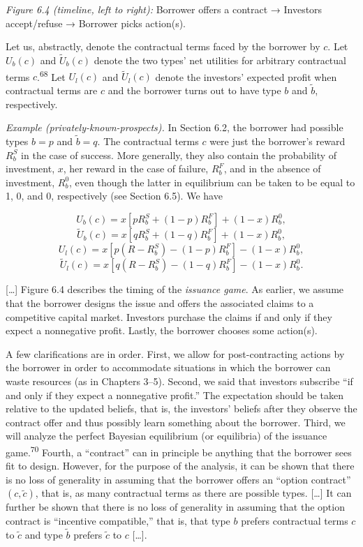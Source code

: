 \documentclass[11pt,a4paper]{article}
\begin{document}
\emph{Figure 6.4 (timeline, left to right):} Borrower offers a contract → Investors accept/refuse →
Borrower picks action(s).

Let us, abstractly, denote the contractual terms faced by the borrower by \(c\). Let \(U_b(c)\) and
\(\tilde{U}_b(c)\) denote the two types' net utilities for arbitrary contractual terms
\(c\).\textsuperscript{68} Let \(U_l(c)\) and \(\tilde{U}_l(c)\) denote the investors' expected
profit when contractual terms are \(c\) and the borrower turns out to have type \(b\) and
\(\tilde{b}\), respectively.

\emph{Example (privately-known-prospects).} In Section 6.2, the borrower had possible types
\(b = p\) and \(\tilde{b} = q\). The contractual terms \(c\) were just the borrower's reward
\(R_b^S\) in the case of success. More generally, they also contain the probability of investment,
\(x\), her reward in the case of failure, \(R_b^F\), and in the absence of investment, \(R_b^0\),
even though the latter in equilibrium can be taken to be equal to 1, 0, and 0, respectively (see
Section 6.5). We have

\[U_b(c) = x[pR_b^S + (1 - p)R_b^F] + (1 - x)R_b^0,\]
\[\tilde{U}_b(c) = x[qR_b^S + (1 - q)R_b^F] + (1 - x)R_b^0,\]
\[U_l(c) = x[p(R - R_b^S) - (1 - p)R_b^F] - (1 - x)R_b^0,\]
\[\tilde{U}_l(c) = x[q(R - R_b^S) - (1 - q)R_b^F] - (1 - x)R_b^0.\]

{[}\ldots{]} Figure 6.4 describes the timing of the \emph{issuance game}. As earlier, we assume that
the borrower designs the issue and offers the associated claims to a competitive capital market.
Investors purchase the claims if and only if they expect a nonnegative profit. Lastly, the borrower
chooses some action(s).

A few clarifications are in order. First, we allow for post-contracting actions by the borrower in
order to accommodate situations in which the borrower can waste resources (as in Chapters 3--5).
Second, we said that investors subscribe ``if and only if they expect a nonnegative profit.'' The
expectation should be taken relative to the updated beliefs, that is, the investors' beliefs after
they observe the contract offer and thus possibly learn something about the borrower. Third, we will
analyze the perfect Bayesian equilibrium (or equilibria) of the issuance game.\textsuperscript{70}
Fourth, a ``contract'' can in principle be anything that the borrower sees fit to design. However,
for the purpose of the analysis, it can be shown that there is no loss of generality in assuming
that the borrower offers an ``option contract'' \((c, \tilde{c})\), that is, as many contractual
terms as there are possible types. {[}\ldots{]} It can further be shown that there is no loss of
generality in assuming that the option contract is ``incentive compatible,'' that is, that type
\(b\) prefers contractual terms \(c\) to \(\tilde{c}\) and type \(\tilde{b}\) prefers \(\tilde{c}\)
to \(c\) {[}\ldots{]}.
\end{document}
